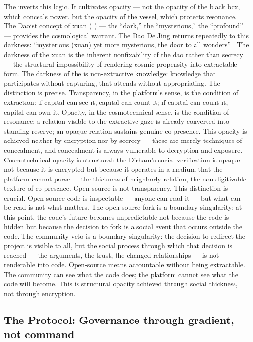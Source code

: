 The  inverts this logic. It cultivates opacity — not the opacity of the black box, which conceals power, but the opacity of the vessel, which protects resonance. The Daoist concept of xuan (  ) — the “dark,” the “mysterious,” the “profound” — provides the cosmological warrant. The Dao De Jing returns repeatedly to this darkness: “mysterious (xuan) yet more mysterious, the door to all wonders” \cite[ch.~1]{laozi_2003}. The darkness of the xuan is the inherent nonfixability of the dao rather than secrecy — the structural impossibility of rendering cosmic propensity into extractable form. The darkness of the  is non-extractive knowledge: knowledge that participates without capturing, that attends without appropriating. The distinction is precise. Transparency, in the platform’s sense, is the condition of extraction: if capital can see it, capital can count it; if capital can count it, capital can own it. Opacity, in the cosmotechnical sense, is the condition of resonance: a relation visible to the extractive gaze is already converted into standing-reserve; an opaque relation sustains genuine co-presence. This opacity is achieved neither by encryption nor by secrecy — these are merely techniques of concealment, and concealment is always vulnerable to decryption and exposure. Cosmotechnical opacity is structural: the Dirham’s social verification is opaque not because it is encrypted but because it operates in a medium that the platform cannot parse — the thickness of neighborly relation, the non-digitizable texture of co-presence. Open-source is not transparency. This distinction is crucial. Open-source code is inspectable — anyone can read it — but what can be read is not what matters. The open-source fork is a boundary singularity: at this point, the code’s future becomes unpredictable not because the code is hidden but because the decision to fork is a social event that occurs outside the code. The community veto is a boundary singularity: the decision to redirect the project is visible to all, but the social process through which that decision is reached — the arguments, the trust, the changed relationships — is not renderable into code. Open-source means accountable without being extractable. The community can see what the code does; the platform cannot see what the code will become. This is structural opacity achieved through social thickness, not through encryption.

\subsection{The  Protocol: Governance through gradient, not command}


